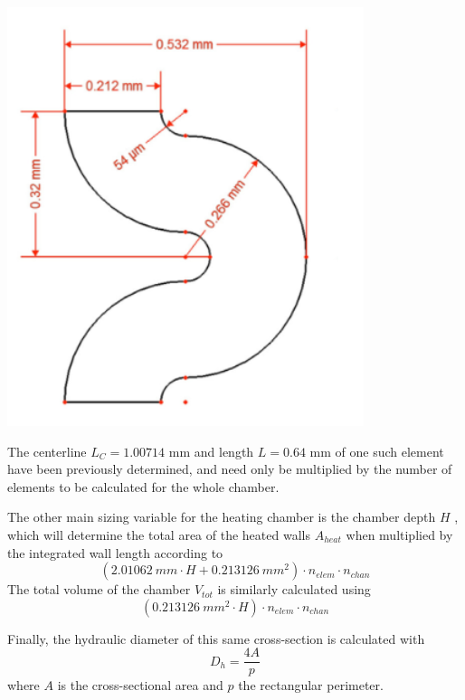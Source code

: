 \documentclass{homework}
\begin{document}
\begin{multicols}{2}
   \begin{minipage}{\linewidth}
      \centering
      \includegraphics[width=\linewidth]{images/image_1691249918616_0.png}
      \label{fig:element_dimensions}
  \end{minipage} 
	    
	  The centerline $L_C = 1.00714$ mm and length $L = 0.64$ mm of one such element have been previously determined, and need only be multiplied by the number of elements to be calculated for the whole chamber.  
	    
	  The other main sizing variable for the heating chamber is the chamber depth $H$ , which will determine the total area of the heated walls $A_{heat}$ when multiplied by the integrated wall length according to $$(2.01062 \ mm \cdot H + 0.213126 \ mm^{2} ) \cdot n_{elem} \cdot n_{chan}$$ The total volume of the chamber $V_{tot}$ is similarly calculated using $$ (0.213126 \ mm^{2} \cdot H ) \cdot n_{elem} \cdot n_{chan}$$  
	    
	  Finally, the hydraulic diameter of this same cross-section is calculated with $$D_h=\frac{4 A}{p}$$ where $A$ is the cross-sectional area and $p$ the rectangular perimeter.  
   

\end{multicols}
\end{document}
